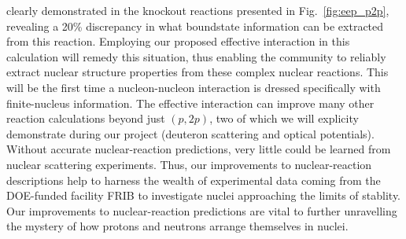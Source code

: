\documentclass[12pt]{article}
\begin{document}
 clearly demonstrated in the knockout reactions presented in Fig.~\ref{fig:eep_p2p}, revealing a 20\% discrepancy in what boundstate information can be extracted from this
 reaction. Employing our proposed effective interaction in this calculation will remedy this situation, thus enabling the community to reliably extract nuclear structure properties
 from these complex nuclear reactions. This will be the first time a nucleon-nucleon interaction is dressed specifically with finite-nucleus information. The effective interaction
 can improve many other reaction calculations beyond just $(p,2p)$, two of which we will explicity demonstrate during our project (deuteron scattering and optical potentials).
 Without accurate nuclear-reaction predictions, very little could be learned from nuclear scattering experiments. Thus, our improvements to nuclear-reaction descriptions help to
 harness the wealth of experimental data coming from the DOE-funded facility FRIB to investigate nuclei approaching the limits of stablity.  Our improvements to nuclear-reaction
 predictions are vital to further unravelling the mystery of how protons and neutrons arrange themselves in nuclei.

%
   
   

   
\end{document}
